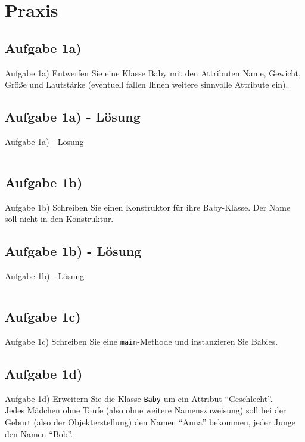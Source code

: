 \documentclass[usepdftitle=false,hyperref={pdfpagelabels=false}]{beamer}
\begin{document}
\section{Praxis}
\subsection{Aufgabe 1a)}
\begin{frame}{Aufgabe 1a)}
    Entwerfen Sie eine Klasse Baby mit den Attributen Name, Gewicht,
    Größe und Lautstärke (eventuell fallen Ihnen weitere sinnvolle
    Attribute ein).
\end{frame}

\subsection{Aufgabe 1a) - Lösung}
\begin{frame}{Aufgabe 1a) - Lösung}
    \inputminted[linenos, numbersep=5pt, tabsize=4, frame=lines, label=Baby.java, fontsize=\tiny]{java}{Baby.java}
\end{frame}

\subsection{Aufgabe 1b)}
\begin{frame}{Aufgabe 1b)}
    Schreiben Sie einen Konstruktor für ihre Baby-Klasse. Der Name
    soll nicht in den Konstruktur.
\end{frame}

\subsection{Aufgabe 1b) - Lösung}
\begin{frame}{Aufgabe 1b) - Lösung}
    \inputminted[linenos, numbersep=5pt, tabsize=4, frame=lines, label=Baby.java, fontsize=\tiny]{java}{Baby-02.java}
\end{frame}

\subsection{Aufgabe 1c)}
\begin{frame}{Aufgabe 1c)}
    Schreiben Sie eine \texttt{main}-Methode und instanzieren Sie Babies.
\end{frame}

\subsection{Aufgabe 1d)}
\begin{frame}{Aufgabe 1d)}
    Erweitern Sie die Klasse \texttt{Baby} um ein Attribut "`Geschlecht"'.\\

    Jedes Mädchen ohne Taufe ({\tiny also ohne weitere Namenszuweisung})
    soll  bei der Geburt ({\tiny also der Objekterstellung}) den Namen "`Anna"'
    bekommen, jeder Junge den Namen "`Bob"'.
\end{frame}
\end{document}
